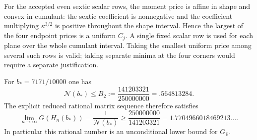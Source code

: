 \documentclass{article}
\newcommand{\N}{\mathcal N}
\begin{document}
\begin{remark}
For the accepted even sextic scalar rows, the moment price is affine in
shape and convex in cumulant: the sextic coefficient is nonnegative and
the coefficient multiplying $\kappa^{3/2}$ is positive throughout the
shape interval. Hence the largest of the four endpoint prices is a
uniform $C_j$. A single fixed scalar row is used for each plane over the
whole cumulant interval. Taking the smallest uniform price among several
such rows is valid; taking separate minima at the four corners would
require a separate justification.
\end{remark}
\begin{theorem}
\label{thm:global-b7171-polygon}
For $b_*=7171/10000$ one has
\[
 \N(b_*)\le B_2:=\frac{141203321}{250000000}=.564813284.
\]
The explicit reduced rational matrix sequence therefore satisfies
\[
 \lim_{n\to\infty}G(H_n(b_*))
 =\frac1{\N(b_*)}
 \ge\frac{250000000}{141203321}
 =1.7704966018469213\ldots .
\]
In particular this rational number is an unconditional lower bound for
$G_{\mathbb R}$.
\end{theorem}
\end{document}
